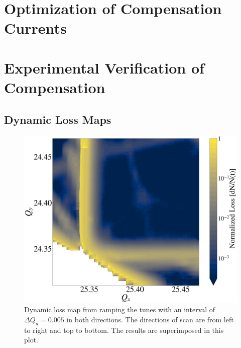 \section{Optimization of Compensation Currents}

\section{Experimental Verification of Compensation}

\subsection{\label{sec:lossmaps}Dynamic Loss Maps}

\begin{figure}[H]
    \centering
    \includegraphics[width=\columnwidth]{chapter4/bare.png}
    \caption{Dynamic loss map from ramping the tunes with an interval of $\Delta Q_u=0.005$ in both directions. The directions of scan are from left to right and top to bottom. The results are superimposed in this plot.}
    \label{fig:bare_nocomments}
\end{figure}

